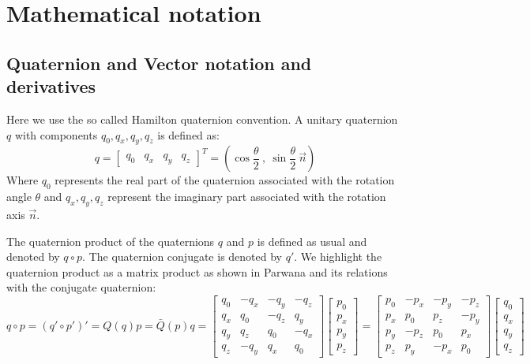 
\section{Mathematical notation}
\subsection{Quaternion and Vector notation and derivatives}
Here we use the so called Hamilton quaternion convention. A unitary quaternion $q$ with components $q_0, q_x, q_y, q_z$ is defined as:
\begin{equation}
 q = 
 \left[ \begin{matrix}
 q_0 & q_x & q_y & q_z
 \end{matrix}  \right]^T = \left( \cos \frac{\theta}{2} \ , \ \sin \frac{\theta}{2} \ \vec{n} \right)
\end{equation}
Where $q_0$ represents the real part of the quaternion associated with the rotation angle $\theta$ and $q_x, q_y, q_z$ represent the imaginary part associated with the rotation axis $\vec{n}$.

The quaternion product of the quaternions $q$ and $p$ is defined as usual and denoted by $q \circ p$. The quaternion conjugate is denoted by $q'$. We highlight the quaternion product as a matrix product as shown in Parwana \cite{parwana2017quaternion} and its relations with the conjugate quaternion:
\begin{equation}
q \circ p = (q' \circ p')' = Q(q) p = \bar{Q}(p) q 
= 
\left[\begin{matrix}
  q_0 & -q_x & -q_y & -q_z \\
  q_x & q_0 & -q_z & q_y \\
  q_y & q_z & q_0 & -q_x \\
  q_z & -q_y & q_x & q_0 
\end{matrix}\right]
 \left[ \begin{matrix}
p_0 \\ p_x \\ p_y \\ p_z
\end{matrix}  \right]
=
\left[\begin{matrix}
p_0 & -p_x & -p_y & -p_z \\
p_x & p_0 & p_z & -p_y \\
p_y & -p_z & p_0 & p_x \\
p_z & p_y & -p_x & p_0 
\end{matrix}\right]
\left[ \begin{matrix}
q_0 \\ q_x \\ q_y \\ q_z
\end{matrix}  \right]
\end{equation}

